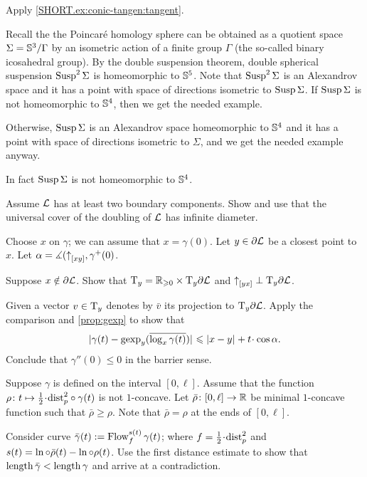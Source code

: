  Apply \ref{SHORT.ex:conic-tangen:tangent}.

 Recall the the Poincaré homology sphere can be obtained as a quotient space $\Sigma=\mathbb{S}^3/\Gamma$ by an isometric action of a finite group $\Gamma$ (the so-called binary icosahedral group).
By the double suspension theorem, double spherical suspension $\mathop{\rm Susp}\nolimits^2\Sigma$ is homeomorphic to $\mathbb{S}^5$.
Note that $\mathop{\rm Susp}\nolimits^2\Sigma$ is an Alexandrov space and it has a point with space of directions isometric to $\mathop{\rm Susp}\nolimits\Sigma$.
If $\mathop{\rm Susp}\nolimits\Sigma$ is not homeomorphic to $\mathbb{S}^4$, then we get the needed example.

Otherwise, $\mathop{\rm Susp}\nolimits\Sigma$ is an Alexandrov space homeomorphic to $\mathbb{S}^4$ and it has a point with space of directions isometric to $\Sigma$,
and we get the needed example anyway.

In fact $\mathop{\rm Susp}\nolimits\Sigma$ is not homeomorphic to $\mathbb{S}^4$.





Assume $\mathcal{L}$ has at least two boundary components.
Show and use that the universal cover of the doubling of $\mathcal{L}$ has infinite diameter.

 Choose $x$ on $\gamma$;
we can assume that $x=\gamma(0)$.
Let $y\in \partial \mathcal{L}$ be a closest point to $x$.
Let $\alpha=\measuredangle({\uparrow}_{[{x}{y}]},\gamma^+(0)$.

Suppose $x\notin \partial \mathcal{L}$.
Show that $\mathrm{T}_y=\mathbb{R}_{\geqslant0}\times\mathrm{T}_y\partial \mathcal{L}$
and ${\uparrow}_{[{y}{x}]}\perp \mathrm{T}_y\partial \mathcal{L}$.

Given a vector $v\in \mathrm{T}_y$ denotes by $\bar v$ its projection to $\mathrm{T}_y\partial \mathcal{L}$.
Apply the comparison and \ref{prop:gexp} to show that 
\[\dist{\gamma(t)}{\gexp_y(\overline{\log_x\gamma(t)})}{}\le \dist{x}{y}{}+t\cdot\cos\alpha.\]
Conclude that $\gamma''(0)\le 0$ in the barrier sense.


Suppose $\gamma$ is defined on the interval $[0,\ell]$.
Assume that the function $\rho\:t\mapsto \tfrac12\cdot\distfun_p^2\circ\gamma(t)$ is not $1$-concave.
Let $\bar\rho\colon[0,\ell]\to\mathbb{R}$ be minimal $1$-concave function such that $\bar\rho\ge \rho$.
Note that $\bar\rho=\rho$ at the ends of $[0,\ell]$.

Consider curve $\bar\gamma(t)\mathrel{:=} \mathop{\rm Flow}\nolimits_f^{s(t)}\gamma(t)$;
where $f=\tfrac12\cdot\distfun_p^2$ and $s(t)\z=\ln\circ\bar\rho(t)-\ln\circ\rho(t)$.
Use the first distance estimate to show that $\mathop{\rm length}\nolimits\bar\gamma<\mathop{\rm length}\nolimits\gamma$ and arrive at a contradiction.

